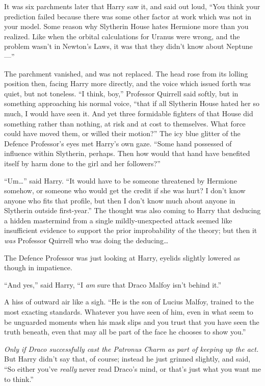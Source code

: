 It was six parchments later that Harry saw it, and said out loud, “You think your prediction failed because there was some other factor at work which was not in your model. Some reason why Slytherin House hates Hermione more than you realized. Like when the orbital calculations for Uranus were wrong, and the problem wasn’t in Newton’s Laws, it was that they didn’t know about Neptune—”

The parchment vanished, and was not replaced. The head rose from its lolling position then, facing Harry more directly, and the voice which issued forth was quiet, but not toneless. “I think, boy,” Professor Quirrell said softly, but in something approaching his normal voice, “that if all Slytherin House hated her so much, I would have seen it. And yet three formidable fighters of that House did something rather than nothing, at risk and at cost to themselves. What force could have moved them, or willed their motion?” The icy blue glitter of the Defence Professor’s eyes met Harry’s own gaze. “Some hand possessed of influence within Slytherin, perhaps. Then how would that hand have benefited itself by harm done to the girl and her followers?”

“Um…” said Harry. “It would have to be someone threatened by Hermione somehow, or someone who would get the credit if she was hurt? I don’t know anyone who fits that profile, but then I don’t know much about anyone in Slytherin outside first-year.” The thought was also coming to Harry that deducing a hidden mastermind from a single mildly-unexpected attack seemed like insufficient evidence to support the prior improbability of the theory; but then it \emph{was} Professor Quirrell who was doing the deducing…

The Defence Professor was just looking at Harry, eyelids slightly lowered as though in impatience.

“And yes,” said Harry, “I \emph{am} sure that Draco Malfoy isn’t behind it.”

A hiss of outward air like a sigh. “He is the son of Lucius Malfoy, trained to the most exacting standards. Whatever you have seen of him, even in what seem to be unguarded moments when his mask slips and you trust that you have seen the truth beneath, even that may all be part of the face he chooses to show you.”

\emph{Only if Draco successfully cast the Patronus Charm as part of keeping up the act.} But Harry didn’t say that, of course; instead he just grinned slightly, and said, “So either you’ve \emph{really} never read Draco’s mind, or that’s just what you want me to think.”

